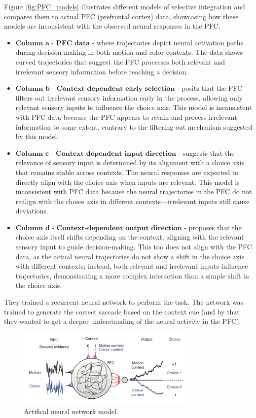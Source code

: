 \documentclass[11pt]{book} %
\begin{document}
Figure \ref{fig:PFC_models} illustrates different models of selective integration and compares them to actual PFC (prefrontal cortex) data, 
showcasing how these models are inconsistent with the observed neural responses in the PFC.
\begin{itemize}
    \item $\textbf{Column a - PFC data}$ - where trajectories depict neural activation paths during decision-making in both motion and color contexts.
    The data shows curved trajectories that suggest the PFC processes both relevant and irrelevant sensory information before reaching a decision.
    \item $\textbf{Column b - Context-dependent early selection}$ - posits that the PFC filters out irrelevant sensory information early in the process, 
    allowing only relevant sensory inputs to influence the choice axis. This model is inconsistent with PFC data because the PFC appears 
    to retain and process irrelevant information to some extent, contrary to the filtering-out mechanism suggested by this model.
    \item $\textbf{Column c - Context-dependent input direction}$ - suggests that the relevance of sensory input is determined by its 
    alignment with a choice axis that remains stable across contexts.
    The neural responses are expected to directly align with the choice axis when inputs are relevant. 
    This model is inconsistent with PFC data because the neural trajectories in the PFC do not realign with the choice axis in different contexts—irrelevant inputs still cause deviations.
    \item $\textbf{Column d - Context-dependent output direction}$ - proposes that the choice axis itself shifts depending on the context, aligning with the relevant sensory 
    input to guide decision-making. This too does not align with the PFC data, as the actual neural trajectories do not show a shift 
    in the choice axis with different contexts; instead, both relevant and irrelevant inputs influence trajectories, demonstrating a more complex 
    interaction than a simple shift in the choice axis.
\end{itemize}




They trained a recurrent neural network to perform the task. 
The network was trained to generate the correct saccade based on the context cue (and by that they wanted to get a deeper understanding of the neural activity in the PFC).

\begin{figure}[h]
    \centering
    \includegraphics[width=0.8\textwidth]{./Figs/PFC5.jpeg}
    \caption{Artifical neural network model.}
    \label{fig:PFC_NN}
\end{figure}
\end{document}
